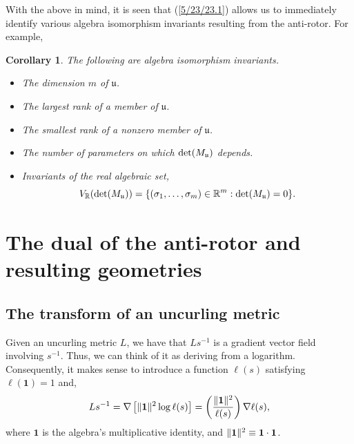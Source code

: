 \documentclass{amsart}
\newtheorem{corollary}[theorem]{Corollary}
\theoremstyle{definition}
\numberwithin{theorem}{section}
\numberwithin{equation}{section}
\begin{document}
   With the above in mind, it is seen that (\ref{5/23/23.1}) allows us to immediately identify various algebra isomorphism invariants resulting from the anti-rotor. For example,
   
   \newpage
      
       
  \begin{corollary}\label{8/18/23.2} The following are algebra isomorphism invariants. \begin{itemize} \item The dimension $m$ of $\mathfrak{u}$.   \item The largest rank  of a member of $\mathfrak{u}$.  \item The smallest rank of a nonzero member of $\mathfrak{u}$. \item The number of parameters on which ${\rm det}(M_{\mathfrak{u}})$ depends. \item Invariants of the real algebraic set, \[V_\mathbb{R}({\rm det}(M_{\mathfrak{u}})) = \{(\sigma_1,\dots,\sigma_m)\in\mathbb{R}^m: {\rm det}(M_{\mathfrak{u}}) = 0 \}.\] \end{itemize} \end{corollary}
  
  \bigskip
   
  \section{The dual of the anti-rotor and resulting geometries} 
  \subsection{The transform of an uncurling metric}
  

 Given an uncurling metric $L$, we have that $Ls^{-1}$ is a gradient vector field involving $s^{-1}$.  Thus, we can think of it as deriving from a logarithm.  Consequently, it makes sense to introduce a function $\ell(s)$ satisfying $\ell(\mathbf{1})=1$ and,
  \begin{equation}\label{11/7/20.1} Ls^{-1}  = \nabla\left[\|{\bf 1}\|^2\log  \ell(s)\right] =   \left(\frac{\|{\bf 1}\|^2}{ \ell(s)}\right)\nabla \ell(s),\end{equation} where $\mathbf{1}$ is the algebra's multiplicative identity, and $\|{\bf 1}\|^2 \equiv {\bf 1}\cdot {\bf 1}$. 
\end{document}
